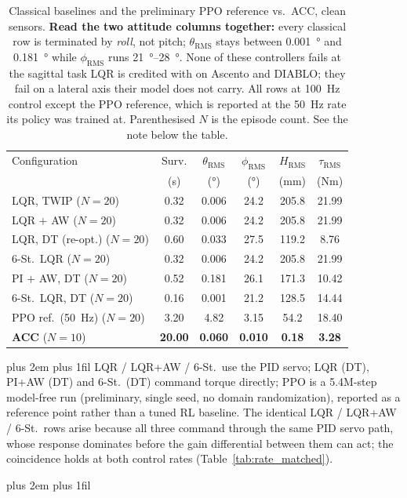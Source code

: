 \documentclass[conference]{IEEEtran}
\newcommand{\tabnote}{\par\leftskip=0pt\rightskip=0pt plus 2em%
  \parfillskip=0pt plus 1fil\relax}
\begin{document}
\begin{table}[t]
\centering
\footnotesize
\caption{Classical baselines and the preliminary PPO reference vs.\ ACC, clean sensors. \textbf{Read the two attitude columns together:} every classical row is terminated by \emph{roll}, not pitch; $\theta_{\text{RMS}}$ stays between \SI{0.001}{\degree} and \SI{0.181}{\degree} while $\phi_{\text{RMS}}$ runs \SIrange{21}{28}{\degree}. None of these controllers fails at the sagittal task LQR is credited with on Ascento and DIABLO; they fail on a lateral axis their model does not carry. All rows at \SI{100}{Hz} control except the PPO reference, which is reported at the \SI{50}{Hz} rate its policy was trained at. Parenthesised $N$ is the episode count. See the note below the table.}
\label{tab:lqr_baselines}
\setlength{\tabcolsep}{4pt}
\begin{tabular}{@{}l S[table-format=2.2] S[table-format=1.3] S[table-format=2.2] S[table-format=3.1] S[table-format=2.2]@{}}
\toprule
Configuration & {Surv.} & {$\theta_{\text{RMS}}$} & {$\phi_{\text{RMS}}$} & {$H_{\text{RMS}}$} & {$\tau_{\text{RMS}}$} \\
& {(s)} & {(\si{\degree})} & {(\si{\degree})} & {(mm)} & {(Nm)} \\
\midrule
LQR, TWIP ($N{=}20$)         & 0.32 & 0.006 & 24.2 & 205.8 & 21.99 \\
LQR $+$ AW ($N{=}20$)        & 0.32 & 0.006 & 24.2 & 205.8 & 21.99 \\
LQR, DT (re-opt.) ($N{=}20$) & 0.60 & 0.033 & 27.5 & 119.2 & 8.76 \\
6-St.\ LQR ($N{=}20$)        & 0.32 & 0.006 & 24.2 & 205.8 & 21.99 \\
PI $+$ AW, DT ($N{=}20$)     & 0.52 & 0.181 & 26.1 & 171.3 & 10.42 \\
6-St.\ LQR, DT ($N{=}20$)    & 0.16 & 0.001 & 21.2 & 128.5 & 14.44 \\
PPO ref.\ (\SI{50}{Hz}) ($N{=}20$)& 3.20 & 4.82  & 3.15 & 54.2  & 18.40 \\
\midrule
\textbf{ACC} ($N{=}10$)      & \bfseries 20.00 & \bfseries 0.060 & \bfseries 0.010 & \bfseries 0.18 & \bfseries 3.28 \\
\bottomrule
\end{tabular}
\vspace{3pt}\tabnote\noindent\footnotesize
LQR / LQR+AW / 6-St.\ use the PID servo; LQR (DT), PI+AW (DT) and 6-St.\ (DT) command torque directly; PPO is a 5.4M-step model-free run (preliminary, single seed, no domain randomization), reported as a reference point rather than a tuned RL baseline. The identical LQR / LQR+AW / 6-St.\ rows arise because all three command through the same PID servo path, whose response dominates before the gain differential between them can act; the coincidence holds at both control rates (Table~\ref{tab:rate_matched}).\tabnote\noindent

\end{table}
\end{document}
